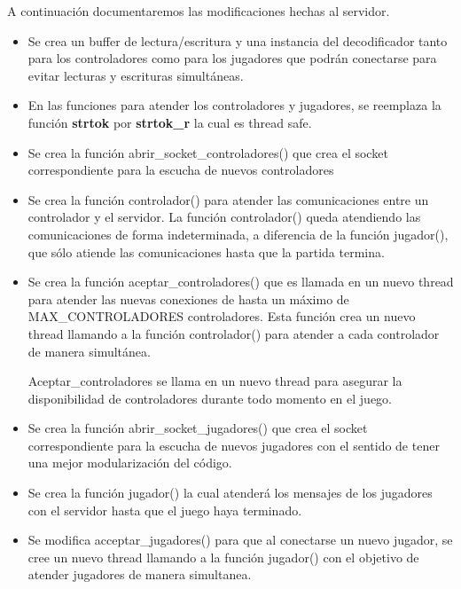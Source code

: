 \documentclass[a4paper,10pt,twoside]{article}
\begin{document}
A continuación documentaremos las modificaciones hechas al servidor.

\begin{itemize}
    \item Se crea un buffer de lectura/escritura y una instancia del decodificador tanto para los controladores como para los jugadores que podrán conectarse para evitar lecturas y escrituras simultáneas.

    \item En las funciones para atender los controladores y jugadores, se reemplaza la función \textbf{strtok} por \textbf{strtok\_r} la cual es thread safe.

    \item Se crea la función abrir\_socket\_controladores() que crea el socket correspondiente para la escucha de nuevos controladores
    
    \item Se crea la función controlador() para atender las comunicaciones entre un controlador y el servidor. La función controlador() queda atendiendo las comunicaciones de forma indeterminada, a diferencia de la función jugador(), que sólo atiende las comunicaciones hasta que la partida termina.
    
    \item Se crea la función aceptar\_controladores() que es llamada en un nuevo thread para atender las nuevas conexiones de hasta un máximo de MAX\_CONTROLADORES controladores. Esta función crea un nuevo thread llamando a la función controlador() para atender a cada controlador de manera simultánea.

    Aceptar\_controladores  se llama en un nuevo thread para asegurar la disponibilidad de controladores durante todo momento en el juego.
    
    \item Se crea la función abrir\_socket\_jugadores() que crea el socket correspondiente para la escucha de nuevos jugadores con el sentido de tener una mejor modularización del código.
    
    \item Se crea la función jugador() la cual atenderá los mensajes de los jugadores con el servidor hasta que el juego haya terminado.
    
    \item Se modifica acceptar\_jugadores() para que al conectarse un nuevo jugador, se cree un nuevo thread llamando a la función jugador() con el objetivo de atender jugadores de manera simultanea.
    

\end{itemize}
\end{document}
